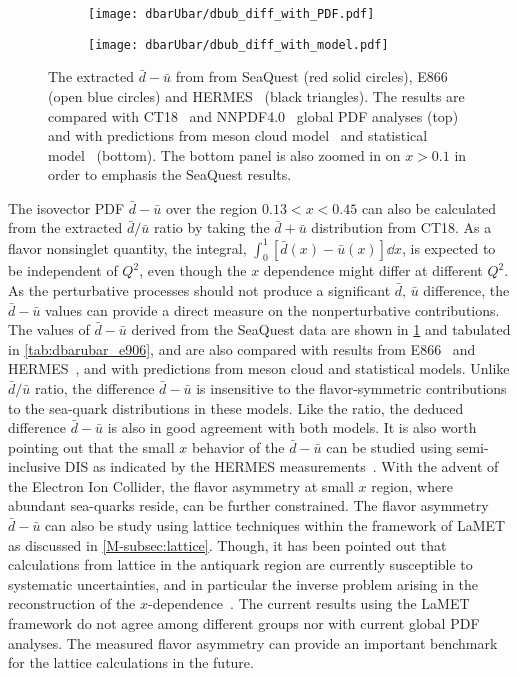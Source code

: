 \documentclass[../main.tex]{subfiles}
\begin{document}
\begin{figure}[htpb!]
	\centering
	\begin{subfigure}{0.55\linewidth}
		\texttt{[image: dbarUbar/dbub\_diff\_with\_PDF.pdf]}
	\end{subfigure}
	\begin{subfigure}{0.55\linewidth}
		\texttt{[image: dbarUbar/dbub\_diff\_with\_model.pdf]}
	\end{subfigure}
	\caption{The extracted $\bar{d}-\bar{u}$ from from SeaQuest (red solid circles), E866~\cite{towell2001} (open blue circles)
		and HERMES~\cite{ackerstaff1998} (black triangles).
		The results are compared with CT18~\cite{hou2021} and NNPDF4.0~\cite{ball2022a} global PDF analyses (top)
		and with predictions from meson cloud model~\cite{alberg2022} and statistical model~\cite{soffer2019} (bottom).
		The bottom panel is also zoomed in on $x>0.1$ in order to emphasis the SeaQuest results.}
	\label{fig:e906_e866_dbarMubar}
\end{figure}
The isovector PDF $\bar{d}-\bar{u}$ over the region $0.13<x<0.45$
can also be calculated from the extracted $\bar{d}/\bar{u}$ ratio by taking the $\bar{d}+\bar{u}$
distribution from CT18.
As a flavor nonsinglet quantity, the integral, $\int^1_0 \left[\bar{d}\left(x\right) - \bar{u}\left(x\right)\right] \dd{x}$,
is expected to be independent of $Q^2$, even though the $x$ dependence might differ at different $Q^2$.
As the perturbative processes should not produce a significant $\bar{d},\,\bar{u}$ difference,
the $\bar{d}-\bar{u}$ values can provide a direct measure on the nonperturbative contributions.
The values of $\bar{d}-\bar{u}$ derived from the SeaQuest data are shown in \cref{fig:e906_e866_dbarMubar} and tabulated in \cref{tab:dbarubar_e906},
and are also compared with results from E866~\cite{towell2001} and HERMES~\cite{ackerstaff1998},
and with predictions from meson cloud and statistical models.
Unlike $\bar{d}/\bar{u}$ ratio, the difference $\bar{d}-\bar{u}$ is insensitive to the flavor-symmetric contributions
to the sea-quark distributions in these models. Like the ratio, the deduced difference $\bar{d}-\bar{u}$ is also
in good agreement with both models.
It is also worth pointing out that the small $x$ behavior of the $\bar{d}-\bar{u}$ can be studied using
semi-inclusive DIS as indicated by the HERMES measurements~\cite{ackerstaff1998}.
With the advent of the Electron Ion Collider, the flavor asymmetry at small $x$ region, where abundant sea-quarks reside,
can be further constrained.
The flavor asymmetry $\bar{d}-\bar{u}$ can also be study using lattice techniques
within the framework of LaMET as discussed in \cref{M-subsec:lattice}.
Though, it has been pointed out that calculations from lattice in the antiquark region are currently
susceptible to systematic uncertainties,
and in particular the inverse problem arising in the reconstruction of the $x$-dependence~\cite{constantinou2021}.
The current results using the LaMET framework do not agree among different groups nor with current global PDF analyses.
The measured flavor asymmetry can provide an important benchmark for the lattice calculations in the future.
\end{document}

